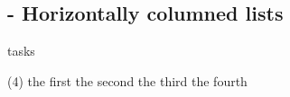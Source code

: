 
\subsection{ - Horizontally columned lists}

\begin{demo}{}{tasks}
  \begin{tasks}(4)
    \task the first
    \task the second
    \task the third
    \task the fourth
  \end{tasks}
\end{demo}
